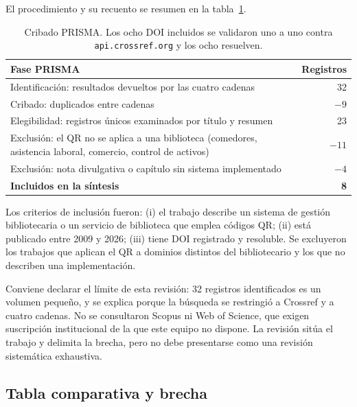 \documentclass[11pt,a4paper]{article}
\begin{document}
El procedimiento y su recuento se resumen en la tabla~\ref{tab:prisma}.

\begin{table}[htbp]
\centering
\small
\begin{tabular}{@{}p{9.4cm}r@{}}
\toprule
\textbf{Fase PRISMA} & \textbf{Registros} \\
\midrule
Identificación: resultados devueltos por las cuatro cadenas & 32 \\
Cribado: duplicados entre cadenas & $-9$ \\
Elegibilidad: registros únicos examinados por título y resumen & 23 \\
Exclusión: el QR no se aplica a una biblioteca (comedores, asistencia laboral, comercio, control de activos) & $-11$ \\
Exclusión: nota divulgativa o capítulo sin sistema implementado & $-4$ \\
\midrule
\textbf{Incluidos en la síntesis} & \textbf{8} \\
\bottomrule
\end{tabular}
\caption{Cribado PRISMA. Los ocho DOI incluidos se validaron uno a uno contra
\texttt{api.crossref.org} y los ocho resuelven.}
\label{tab:prisma}
\end{table}

Los criterios de inclusión fueron: (i) el trabajo describe un sistema de
gestión bibliotecaria o un servicio de biblioteca que emplea códigos QR;
(ii) está publicado entre 2009 y 2026; (iii) tiene DOI registrado y resoluble.
Se excluyeron los trabajos que aplican el QR a dominios distintos del
bibliotecario y los que no describen una implementación.

Conviene declarar el límite de esta revisión: 32 registros identificados es un
volumen pequeño, y se explica porque la búsqueda se restringió a Crossref y a
cuatro cadenas. No se consultaron Scopus ni Web of Science, que exigen
suscripción institucional de la que este equipo no dispone. La revisión sitúa
el trabajo y delimita la brecha, pero no debe presentarse como una revisión
sistemática exhaustiva.

\subsection{Tabla comparativa y brecha}
\end{document}
